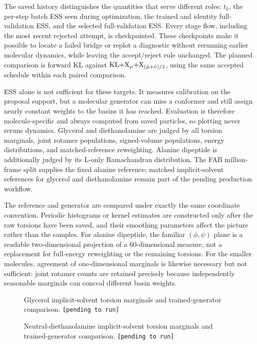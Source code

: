 \documentclass{article}
\begin{document}
The saved history distinguishes the quantities that serve different roles: \(t_k\), the per-step batch ESS seen during optimization, the trained and identity full-validation ESS, and the selected full-validation ESS. Every stage flow, including the most recent rejected attempt, is checkpointed. These checkpoints make it possible to locate a failed bridge or replot a diagnostic without rerunning earlier molecular dynamics, while leaving the accept/reject rule unchanged. The planned comparison is forward KL against \(\mathrm{KL}{+}\mathrm{X}_\mu{+}\mathrm{X}_{(\hat\mu+\bar\nu)/2}\), using the same accepted schedule within each paired comparison.

ESS alone is not sufficient for these targets. It measures calibration on the proposal support, but a molecular generator can miss a conformer and still assign nearly constant weights to the basins it has reached. Evaluation is therefore molecule-specific and always computed from saved particles, so plotting never reruns dynamics. Glycerol and diethanolamine are judged by all torsion marginals, joint rotamer populations, signed-volume populations, energy distributions, and matched-reference reweighting. Alanine dipeptide is additionally judged by its L-only Ramachandran distribution. The FAB million-frame split supplies the fixed alanine reference; matched implicit-solvent references for glycerol and diethanolamine remain part of the pending production workflow.

The reference and generator are compared under exactly the same coordinate convention. Periodic histograms or kernel estimates are constructed only after the raw torsions have been saved, and their smoothing parameters affect the picture rather than the samples. For alanine dipeptide, the familiar \((\phi,\psi)\) plane is a readable two-dimensional projection of a 60-dimensional measure, not a replacement for full-energy reweighting or the remaining torsions. For the smaller molecules, agreement of one-dimensional marginals is likewise necessary but not sufficient: joint rotamer counts are retained precisely because independently reasonable marginals can conceal different basin weights.

\begin{figure}[htb]
\centering
\pendingfigure
\caption{Glycerol implicit-solvent torsion marginals and trained-generator comparison. \texttt{[pending to run]}}
\label{fig: glycerol-dihedrals}
\end{figure}

\begin{figure}[htb]
\centering
\pendingfigure
\caption{Neutral-diethanolamine implicit-solvent torsion marginals and trained-generator comparison. \texttt{[pending to run]}}
\label{fig: dea-dihedrals}
\end{figure}
\end{document}
